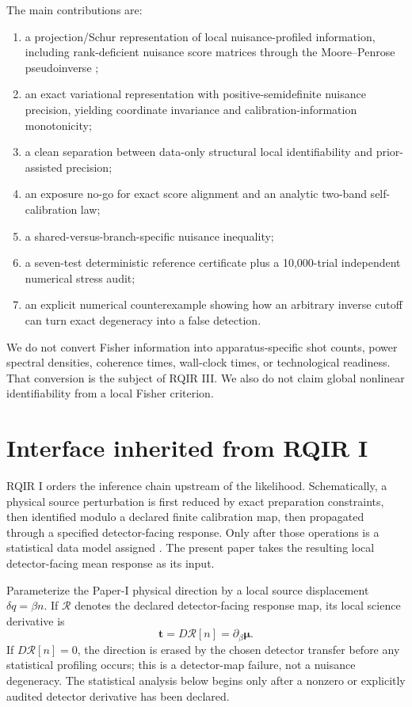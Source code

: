 The main contributions are:
\begin{enumerate}
\item a projection/Schur representation of local nuisance-profiled information, including rank-deficient nuisance score matrices through the Moore--Penrose pseudoinverse \cite{Penrose1955};
\item an exact variational representation with positive-semidefinite nuisance precision, yielding coordinate invariance and calibration-information monotonicity;
\item a clean separation between data-only structural local identifiability and prior-assisted precision;
\item an exposure no-go for exact score alignment and an analytic two-band self-calibration law;
\item a shared-versus-branch-specific nuisance inequality;
\item a seven-test deterministic reference certificate plus a 10,000-trial independent numerical stress audit;
\item an explicit numerical counterexample showing how an arbitrary inverse cutoff can turn exact degeneracy into a false detection.
\end{enumerate}

We do not convert Fisher information into apparatus-specific shot counts, power spectral densities, coherence times, wall-clock times, or technological readiness. That conversion is the subject of RQIR III. We also do not claim global nonlinear identifiability from a local Fisher criterion.

\section{Interface inherited from RQIR I}
\label{sec:interface}

RQIR I orders the inference chain upstream of the likelihood. Schematically, a physical source perturbation is first reduced by exact preparation constraints, then identified modulo a declared finite calibration map, then propagated through a specified detector-facing response. Only after those operations is a statistical data model assigned \cite{RQIRI}. The present paper takes the resulting local detector-facing mean response as its input.

Parameterize the Paper-I physical direction by a local source displacement $\delta q=\beta n$. If $\mathcal R$ denotes the declared detector-facing response map, its local science derivative is
\begin{equation}
 \bm t = D\mathcal R[n]=\partial_\beta\bm\mu.
\label{eq:detectorpush}
\end{equation}
If $D\mathcal R[n]=0$, the direction is erased by the chosen detector transfer before any statistical profiling occurs; this is a detector-map failure, not a nuisance degeneracy. The statistical analysis below begins only after a nonzero or explicitly audited detector derivative has been declared.

